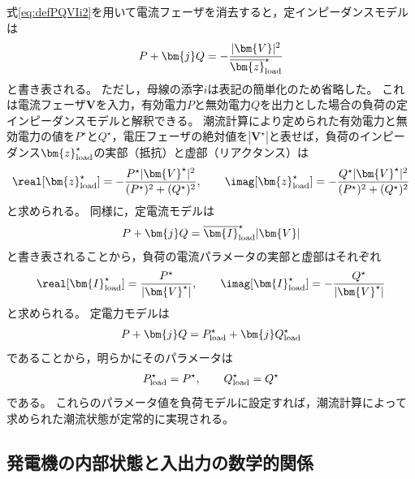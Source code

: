 \documentclass[tombow,dvipdfmx]{corona-a5-1.1}
\begin{document}
式\ref{eq:defPQVIi2}を用いて電流フェーザを消去すると，定インピーダンスモデルは
\begin{align}\label{eq:lmodimp}
P + \bm{j} Q = -\frac{|\bm{V}|^2}{\overline{\bm{z}}_{\rm load}^{\star}} 
\end{align}
と書き表される。
ただし，母線の添字$i$は表記の簡単化のため省略した。
これは電流フェーザ$\bm{V}$を入力，有効電力$P$と無効電力$Q$を出力とした場合の負荷の定インピーダンスモデルと解釈できる。
潮流計算により定められた有効電力と無効電力の値を$P^{\star}$と$Q^{\star}$，電圧フェーザの絶対値を$|\bm{V}^{\star}|$と表せば，負荷のインピーダンス$\bm{z}_{\rm load}^{\star}$の実部（抵抗）と虚部（リアクタンス）は
\begin{align}\label{eq:lmodimppara}
\real [\bm{z}_{\rm load}^{\star}] = - \frac{ P^{\star} |\bm{V}^{\star}|^2 }{(P^{\star})^2 + (Q^{\star})^2}
,\qquad
\imag [\bm{z}_{\rm load}^{\star}] = - \frac{ Q^{\star} |\bm{V}^{\star}|^2 }{(P^{\star})^2 + (Q^{\star})^2}
\end{align}
と求められる。
同様に，定電流モデルは
\begin{align}
P + \bm{j} Q = \overline{\bm{I}}_{\rm load}^{\star} |\bm{V}|
\end{align}
と書き表されることから，負荷の電流パラメータの実部と虚部はそれぞれ
\begin{align*}
\real [\bm{I}_{\rm load}^{\star}]
 =\frac{P^{\star} }{|\bm{V}^{\star}|},\qquad
\imag [\bm{I}_{\rm load}^{\star}]
 = -\frac{ Q^{\star} }{|\bm{V}^{\star}|}
\end{align*}
と求められる。
定電力モデルは
\begin{align}
P + \bm{j} Q =
P_{{\rm load}}^{\star} + \bm{j} Q_{{\rm load}}^{\star} 
\end{align}
であることから，明らかにそのパラメータは
\begin{align*}
P_{\rm load}^{\star}=P^{\star}
,\qquad
Q_{\rm load}^{\star}=Q^{\star}
\end{align*}
である。
これらのパラメータ値を負荷モデルに設定すれば，潮流計算によって求められた潮流状態が定常的に実現される。

\subsection{発電機の内部状態と入出力の数学的関係\advanced}\label{sec:genssPQ}
\end{document}
